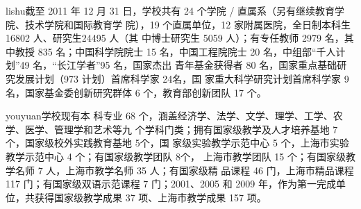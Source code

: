 {\ifcsname lishu\endcsname\lishu\else[无 \cs{lishu} 字体。]\fi 截至 2011 年 12
  月 31 日，学校共有 24 个学院 / 直属系（另有继续教育学院、技术学院和国际教育学
  院），19 个直属单位，12 家附属医院，全日制本科生 16802 人、研究生24495 人（其
  中博士研究生 5059 人）；有专任教师 2979 名，其中教授 835 名；中国科学院院士 15
  名，中国工程院院士 20 名，中组部“千人计划”49 名，“长江学者”95 名，国家杰出
  青年基金获得者 80 名，国家重点基础研究发展计划（973 计划）首席科学家 24名，国
  家重大科学研究计划首席科学家 9名，国家基金委创新研究群体 6 个，教育部创新团队
  17 个。}

{\ifcsname youyuan\endcsname\youyuan\else[无 \cs{youyuan} 字体。]\fi 学校现有本
  科专业 68 个，涵盖经济学、法学、文学、理学、工学、农学、医学、管理学和艺术等九
  个学科门类；拥有国家级教学及人才培养基地 7 个，国家级校外实践教育基地 5个，国
  家级实验教学示范中心 5 个，上海市实验教学示范中心 4 个；有国家级教学团队 8个，
  上海市教学团队 15 个；有国家级教学名师 7 人，上海市教学名师 35 人；有国家级精
  品课程 46 门，上海市精品课程 117 门；有国家级双语示范课程 7 门；2001、2005 和
  2009 年，作为第一完成单位，共获得国家级教学成果 37 项、上海市教学成果 157
  项。}
